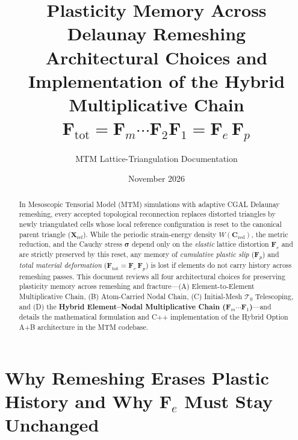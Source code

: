 \documentclass[11pt,a4paper]{article}
\title{\textbf{Plasticity Memory Across Delaunay Remeshing}\\[6pt]
\large Architectural Choices and Implementation of the Hybrid Multiplicative Chain $\mathbf{F}_{\text{tot}} = \mathbf{F}_m \cdots \mathbf{F}_2 \mathbf{F}_1 = \mathbf{F}_e \, \mathbf{F}_p$}
\author{MTM Lattice-Triangulation Documentation}
\date{November 2026}
\begin{document}
\maketitle

\begin{abstract}
\noindent
In Mesoscopic Tensorial Model (MTM) simulations with adaptive CGAL Delaunay remeshing, every accepted topological reconnection replaces distorted triangles by newly triangulated cells whose local reference configuration is reset to the canonical parent triangle ($\mathbf{X}_{\text{ref}}$). While the periodic strain-energy density $W(\mathbf{C}_{\text{red}})$, the metric reduction, and the Cauchy stress $\boldsymbol{\sigma}$ depend only on the \emph{elastic} lattice distortion $\mathbf{F}_e$ and are strictly preserved by this reset, any memory of \emph{cumulative plastic slip} ($\mathbf{F}_p$) and \emph{total material deformation} ($\mathbf{F}_{\text{tot}} = \mathbf{F}_e \, \mathbf{F}_p$) is lost if elements do not carry history across remeshing passes. This document reviews all four architectural choices for preserving plasticity memory across remeshing and fracture---(A) Element-to-Element Multiplicative Chain, (B) Atom-Carried Nodal Chain, (C) Initial-Mesh $\mathcal{T}_0$ Telescoping, and (D) the \textbf{Hybrid Element--Nodal Multiplicative Chain ($\mathbf{F}_m \cdots \mathbf{F}_1$)}---and details the mathematical formulation and C++ implementation of the Hybrid Option A+B architecture in the MTM codebase.
\end{abstract}

\tableofcontents

\section{Why Remeshing Erases Plastic History and Why $\mathbf{F}_e$ Must Stay Unchanged}
\end{document}
